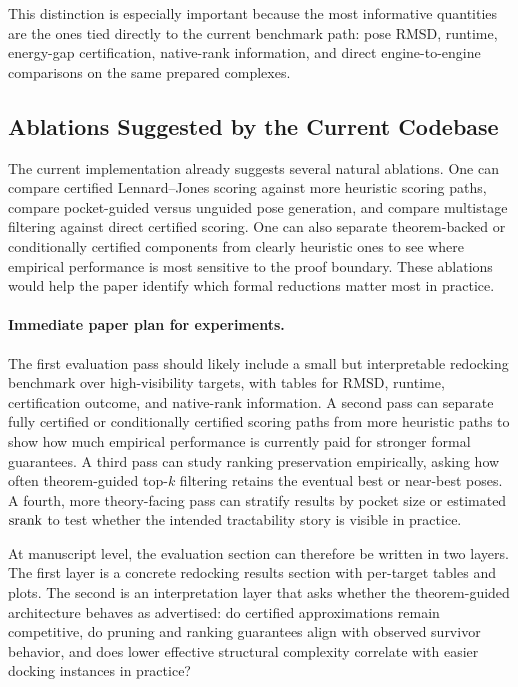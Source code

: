 This distinction is especially important because the most informative quantities are the ones tied directly to the current benchmark path: pose RMSD, runtime, energy-gap certification, native-rank information, and direct engine-to-engine comparisons on the same prepared complexes.

\subsection{Ablations Suggested by the Current Codebase}

The current implementation already suggests several natural ablations. One can compare certified Lennard--Jones scoring against more heuristic scoring paths, compare pocket-guided versus unguided pose generation, and compare multistage filtering against direct certified scoring. One can also separate theorem-backed or conditionally certified components from clearly heuristic ones to see where empirical performance is most sensitive to the proof boundary. These ablations would help the paper identify which formal reductions matter most in practice.

\paragraph{Immediate paper plan for experiments.}
The first evaluation pass should likely include a small but interpretable redocking benchmark over high-visibility targets, with tables for RMSD, runtime, certification outcome, and native-rank information. A second pass can separate fully certified or conditionally certified scoring paths from more heuristic paths to show how much empirical performance is currently paid for stronger formal guarantees. A third pass can study ranking preservation empirically, asking how often theorem-guided top-$k$ filtering retains the eventual best or near-best poses. A fourth, more theory-facing pass can stratify results by pocket size or estimated $\operatorname{srank}$ to test whether the intended tractability story is visible in practice.

At manuscript level, the evaluation section can therefore be written in two layers. The first layer is a concrete redocking results section with per-target tables and plots. The second is an interpretation layer that asks whether the theorem-guided architecture behaves as advertised: do certified approximations remain competitive, do pruning and ranking guarantees align with observed survivor behavior, and does lower effective structural complexity correlate with easier docking instances in practice?
